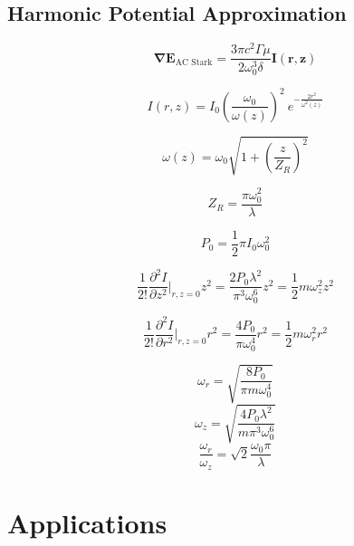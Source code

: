 \documentclass{article}
\newcommand{\p}{\partial}
\begin{document}
\subsection*{Harmonic Potential Approximation}

\[ \mathbf{\nabla E}_\text{AC Stark} = \frac{3\pi c^2\Gamma\mu}{2\omega_0^3\delta}\mathbf{I(r,z)}  \]

\[ I(r,z) = I_0 \left( \frac{\omega_0}{\omega(z)} \right)^2\ e^{\displaystyle -\frac{2r^2}{\omega^2(z)}}  \]

\[ \omega(z) = \omega_0 \sqrt{1 + \left( \frac{z}{Z_R} \right)^2} \]

\[ Z_R = \frac{\pi\omega_0^2}{\lambda}  \]

\[ P_0 = \frac{1}{2} \pi I_0\omega_0^2 \]

\[ \frac{1}{2!}\frac{\p^2I}{\p z^2} \Bigg\vert_{r,z=0} z^2 = \frac{2P_0\lambda^2}{\pi^3\omega_0^6}z^2 = \frac{1}{2}m\omega_z^2z^2  \]

\[ \frac{1}{2!}\frac{\p^2I}{\p r^2} \Bigg\vert_{r,z=0} r^2 = \frac{4P_0}{\pi\omega_0^4}r^2 = \frac{1}{2}m\omega_r^2r^2  \]

\[ \omega_r = \sqrt{\frac{8P_0}{\pi m\omega_0^4}} \]
\[ \omega_z = \sqrt{\frac{4P_0\lambda^2}{m\pi^3\omega_0^6}} \]
\[ \frac{\omega_r}{\omega_z} = \sqrt{2}\frac{\omega_0\pi}{\lambda}  \]





\section*{Applications}





\newpage



\end{document}
